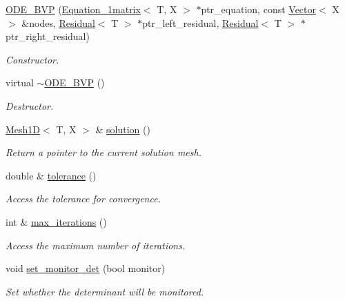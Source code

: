 \begin{DoxyCompactItemize}
\item 
\hyperlink{classLuna_1_1ODE__BVP_adc692c5395375409ac3df8ec8b9ec32b}{O\+D\+E\+\_\+\+B\+VP} (\hyperlink{classLuna_1_1Equation__1matrix}{Equation\+\_\+1matrix}$<$ T, X $>$ $\ast$ptr\+\_\+equation, const \hyperlink{classLuna_1_1Vector}{Vector}$<$ X $>$ \&nodes, \hyperlink{classLuna_1_1Residual}{Residual}$<$ T $>$ $\ast$ptr\+\_\+left\+\_\+residual, \hyperlink{classLuna_1_1Residual}{Residual}$<$ T $>$ $\ast$ptr\+\_\+right\+\_\+residual)
\begin{DoxyCompactList}\small\item\em Constructor. \end{DoxyCompactList}\item 
virtual \hyperlink{classLuna_1_1ODE__BVP_af4ad8cb4bd83a9e41c02bbcf8d28022e}{$\sim$\+O\+D\+E\+\_\+\+B\+VP} ()
\begin{DoxyCompactList}\small\item\em Destructor. \end{DoxyCompactList}\item 
\hyperlink{classLuna_1_1Mesh1D}{Mesh1D}$<$ T, X $>$ \& \hyperlink{classLuna_1_1ODE__BVP_af869c5d4c32de3e2c6dce128f86379a7}{solution} ()
\begin{DoxyCompactList}\small\item\em Return a pointer to the current solution mesh. \end{DoxyCompactList}\item 
double \& \hyperlink{classLuna_1_1ODE__BVP_a9b3eeb599a5d12ebb6bab1b80ff02844}{tolerance} ()
\begin{DoxyCompactList}\small\item\em Access the tolerance for convergence. \end{DoxyCompactList}\item 
int \& \hyperlink{classLuna_1_1ODE__BVP_ad013352e3aa277825cbac01d6334554b}{max\+\_\+iterations} ()
\begin{DoxyCompactList}\small\item\em Access the maximum number of iterations. \end{DoxyCompactList}\item 
void \hyperlink{classLuna_1_1ODE__BVP_a6bf2f309333522cf1a4d251580ee56d5}{set\+\_\+monitor\+\_\+det} (bool monitor)
\begin{DoxyCompactList}\small\item\em Set whether the determinant will be monitored. \end{DoxyCompactList}\item 

\end{DoxyCompactItemize}
